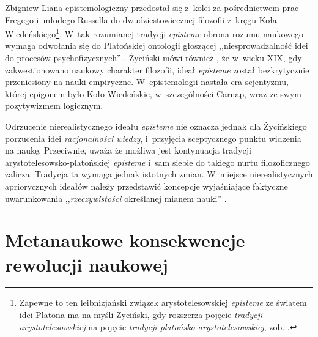 \begin{artplenv}{Zbigniew Liana}
epistemologiczny przedostał się z~kolei za pośrednictwem prac Fregego i~młodego Russella do dwudziestowiecznej
filozofii z~kręgu Koła Wiedeńskiego\footnote{Zapewne to ten leibnizjański związek arystotelesowskiej \textit{episteme} ze
światem idei Platona ma na myśli Życiński, gdy rozszerza pojęcie \textit{tradycji arystotelesowskiej} na pojęcie
\textit{tradycji platońsko-arystotelesowskiej}, zob.
\parencites[s.~12]{zycinski_structure_1988}[s.~22]{zycinski_struktura_2013}[s.~126]{zycinski_elementy_1996}.
}. W~tak rozumianej tradycji \textit{episteme} obrona rozumu naukowego wymaga odwołania się do Platońskiej
ontologii głoszącej ,,niesprowadzalność idei do procesów psychofizycznych''
\parencite[s.~126]{zycinski_elementy_1996}.
Życiński mówi również
\parencite[s.~102n]{zycinski_jezyk_1983},
że w~wieku XIX, gdy zakwestionowano naukowy
charakter filozofii, ideał \textit{episteme} został bezkrytycznie przeniesiony na nauki empiryczne. W~epistemologii
nastała era scjentyzmu, której epigonem było Koło Wiedeńskie, w~szczególności Carnap, wraz ze swym pozytywizmem
logicznym.

Odrzucenie nierealistycznego ideału \textit{episteme} nie oznacza jednak dla Życińskiego porzucenia idei
\textit{racjonalności wiedzy}, i~przyjęcia sceptycznego punktu widzenia na naukę. Przeciwnie, uważa że możliwa jest
kontynuacja tradycji arystotelesowsko-platońskiej \textit{episteme} i~sam siebie do takiego nurtu filozoficznego zalicza.
Tradycja ta wymaga jednak istotnych zmian. W~miejsce nierealistycznych apriorycznych ideałów należy przedstawić
koncepcje wyjaśniające faktyczne uwarunkowania ,,\textit{rzeczywistości} określanej mianem nauki''
\parencite[zob.][s.~126 -- podkreślenie moje]{zycinski_elementy_1996}.

\section{Metanaukowe konsekwencje rewolucji naukowej}\label{lia-sec-4}


\end{artplenv}
